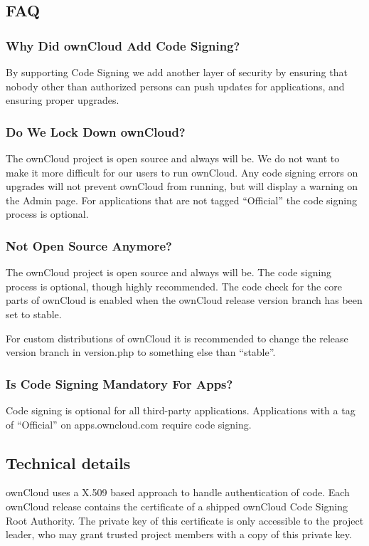 \documentclass[letterpaper,10pt,english]{sphinxmanual}
\begin{document}
\subsection{FAQ}
\label{app/code_signing:faq}

\subsubsection{Why Did ownCloud Add Code Signing?}
\label{app/code_signing:why-did-owncloud-add-code-signing}
By supporting Code Signing we add another layer of security by ensuring that
nobody other than authorized persons can push updates for applications, and
ensuring proper upgrades.


\subsubsection{Do We Lock Down ownCloud?}
\label{app/code_signing:do-we-lock-down-owncloud}
The ownCloud project is open source and always will be. We do not want to make
it more difficult for our users to run ownCloud. Any code signing errors on
upgrades will not prevent ownCloud from running, but will display a warning on
the Admin page. For applications that are not tagged ``Official'' the code signing
process is optional.


\subsubsection{Not Open Source Anymore?}
\label{app/code_signing:not-open-source-anymore}
The ownCloud project is open source and always will be. The code signing
process is optional, though highly recommended. The code check for the
core parts of ownCloud is enabled when the ownCloud release version branch has
been set to stable.

For custom distributions of ownCloud it is recommended to change the release
version branch in version.php to something else than ``stable''.


\subsubsection{Is Code Signing Mandatory For Apps?}
\label{app/code_signing:is-code-signing-mandatory-for-apps}
Code signing is optional for all third-party applications. Applications
with a tag of ``Official'' on apps.owncloud.com require code signing.


\subsection{Technical details}
\label{app/code_signing:technical-details}
ownCloud uses a X.509 based approach to handle authentication of code. Each
ownCloud release contains the certificate of a shipped ownCloud Code Signing
Root Authority. The private key of this certificate is only accessible to the
project leader, who may grant trusted project members with a copy of this
private key.
\end{document}
